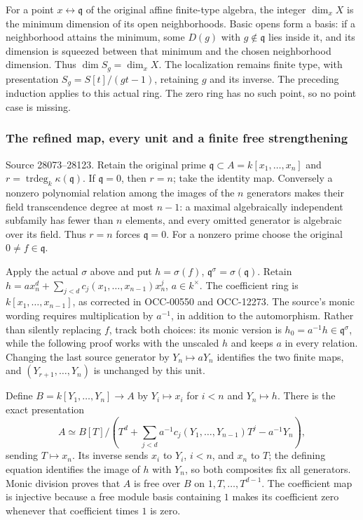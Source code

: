 For a point \(x\leftrightarrow\mathfrak q\) of the original affine finite-type algebra, the integer \(\dim_xX\) is the minimum dimension of its open neighborhoods. Basic opens form a basis: if a neighborhood attains the minimum, some \(D(g)\) with \(g\notin\mathfrak q\) lies inside it, and its dimension is squeezed between that minimum and the chosen neighborhood dimension. Thus \(\dim S_g=\dim_xX\). The localization remains finite type, with presentation \(S_g=S[t]/(gt-1)\), retaining \(g\) and its inverse. The preceding induction applies to this actual ring. The zero ring has no such point, so no point case is missing.

\subsubsection{The refined map, every unit and a finite free strengthening}\label{algebra-proof-026-the-refined-map-every-unit-and-a-finite-free-strengthening}

Source 28073--28123. Retain the original prime \(\mathfrak q\subset A=k[x_1,\ldots,x_n]\) and \(r=\operatorname{trdeg}_k\kappa(\mathfrak q)\). If \(\mathfrak q=0\), then \(r=n\); take the identity map. Conversely a nonzero polynomial relation among the images of the \(n\) generators makes their field transcendence degree at most \(n-1\): a maximal algebraically independent subfamily has fewer than \(n\) elements, and every omitted generator is algebraic over its field. Thus \(r=n\) forces \(\mathfrak q=0\). For a nonzero prime choose the original \(0\ne f\in\mathfrak q\).

Apply the actual \(\sigma\) above and put \(h=\sigma(f)\), \(\mathfrak q^\sigma=\sigma(\mathfrak q)\). Retain \(h=a x_n^d+\sum_{j<d}c_j(x_1,\ldots,x_{n-1})x_n^j\), \(a\in k^\times\). The coefficient ring is \(k[x_1,\ldots,x_{n-1}]\), as corrected in OCC-00550 and OCC-12273. The source's monic wording requires multiplication by \(a^{-1}\), in addition to the automorphism. Rather than silently replacing \(f\), track both choices: its monic version is \(h_0=a^{-1}h\in\mathfrak q^\sigma\), while the following proof works with the unscaled \(h\) and keeps \(a\) in every relation. Changing the last source generator by \(Y_n\mapsto aY_n\) identifies the two finite maps, and \((Y_{r+1},\ldots,Y_n)\) is unchanged by this unit.

Define \(B=k[Y_1,\ldots,Y_n]\to A\) by \(Y_i\mapsto x_i\) for \(i<n\) and \(Y_n\mapsto h\). There is the exact presentation \[
 A\simeq B[T]\big/
 \left(T^d+\sum_{j<d}a^{-1}c_j(Y_1,\ldots,Y_{n-1})T^j-a^{-1}Y_n\right),
\] sending \(T\mapsto x_n\). Its inverse sends \(x_i\) to \(Y_i\), \(i<n\), and \(x_n\) to \(T\); the defining equation identifies the image of \(h\) with \(Y_n\), so both composites fix all generators. Monic division proves that \(A\) is free over \(B\) on \(1,T,\ldots,T^{d-1}\). The coefficient map is injective because a free module basis containing \(1\) makes its coefficient zero whenever that coefficient times \(1\) is zero.

